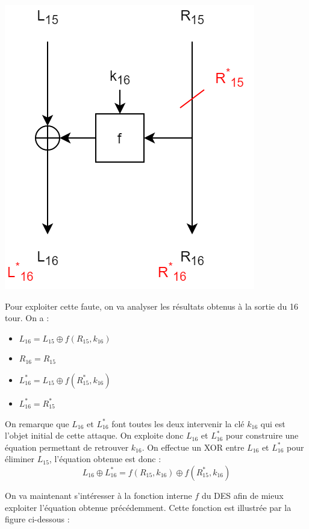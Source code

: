 		\begin{center}\includegraphics[scale=0.4]{DES_atq.png}\end{center}
		
		Pour exploiter cette faute, on va analyser les résultats obtenus à la sortie du 16 tour. On a :
		\begin{itemize}
			\item $L_{16} = L_{15} \oplus f(R_{15}, k_{16})$
			\item $R_{16} = R_{15}$
			\item $L_{16}^{*} = L_{15} \oplus f(R_{15}^{*}, k_{16})$
			\item $L_{16}^{*} = R_{15}^{*}$
		\end{itemize}
		
		On remarque que $L_{16}$ et $L_{16}^{*}$ font toutes les deux intervenir la clé $k_{16}$ qui est l'objet initial de cette attaque. On exploite donc $L_{16}$ et $L_{16}^{*}$ pour construire une équation permettant de retrouver $k_{16}$. On effectue un XOR entre $L_{16}$ et $L_{16}^{*}$ pour éliminer $L_{15}$, l'équation obtenue est donc :
		\[L_{16} \oplus L_{16}^{*} = f(R_{15}, k_{16}) \oplus f(R_{15}^{*}, k_{16}) \]
		
		On va maintenant s'intéresser à la fonction interne $f$ du DES afin de mieux exploiter l'équation obtenue précédemment. Cette fonction est illustrée par la figure ci-dessous :
		

